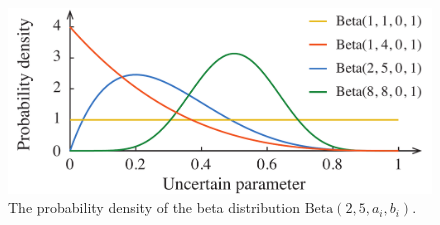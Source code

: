 \begin{figure}[t]
  \centering
  \includegraphics[width=1.0\columnwidth]{include/assets/figures/distribution.pdf}
  \caption{The probability density of the beta distribution $\text{Beta}(2, 5, a_i, b_i)$.}
\end{figure}
